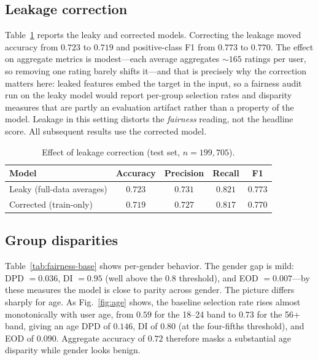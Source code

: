 \documentclass[conference]{IEEEtran}
\begin{document}
\subsection{Leakage correction}
Table~\ref{tab:leakage} reports the leaky and corrected models. Correcting the
leakage moved accuracy from $0.723$ to $0.719$ and positive-class F1 from $0.773$ to
$0.770$. The effect on aggregate metrics is modest---each average aggregates ${\sim}165$
ratings per user, so removing one rating barely shifts it---and that is precisely why
the correction matters here: leaked features embed the target in the input, so a
fairness audit run on the leaky model would report per-group selection rates and
disparity measures that are partly an evaluation artifact rather than a property of
the model. Leakage in this setting distorts the \emph{fairness} reading, not the
headline score. All subsequent results use the corrected model.

\begin{table}[t]
\caption{Effect of leakage correction (test set, $n=199{,}705$).}
\label{tab:leakage}
\centering
\begin{tabular}{lcccc}
\toprule
Model & Accuracy & Precision & Recall & F1 \\
\midrule
Leaky (full-data averages) & $0.723$ & $0.731$ & $0.821$ & $0.773$ \\
Corrected (train-only)     & $0.719$ & $0.727$ & $0.817$ & $0.770$ \\
\bottomrule
\end{tabular}
\end{table}

\subsection{Group disparities}
Table~\ref{tab:fairness-base} shows per-gender behavior. The gender gap is mild:
DPD $=0.036$, DI $=0.95$ (well above the $0.8$ threshold), and EOD $=0.007$---by
these measures the model is close to parity across gender. The picture differs
sharply for age. As Fig.~\ref{fig:age} shows, the baseline selection rate rises
almost monotonically with user age, from $0.59$ for the 18--24 band to $0.73$ for
the 56+ band, giving an age DPD of $0.146$, DI of $0.80$ (at the four-fifths
threshold), and EOD of $0.090$. Aggregate accuracy of $0.72$ therefore masks a
substantial age disparity while gender looks benign.
\end{document}
